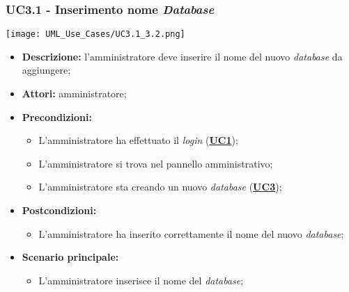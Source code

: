\subsubsection{UC3.1 - Inserimento nome \textit{Database}}
\label{sec:UC3.1}
\texttt{[image: UML\_Use\_Cases/UC3.1\_3.2.png]}
\begin{itemize}
	\item \textbf{Descrizione:} l’amministratore deve inserire il nome del nuovo \textit{database} da aggiungere;
	\item \textbf{Attori:} amministratore;
	\item \textbf{Precondizioni:} 
	\begin{itemize}
		\item L’amministratore ha effettuato il \textit{login} (\hyperref[sec:UC1]{\textbf{UC1}});
		\item L’amministratore si trova nel pannello amministrativo;
		\item L’amministratore sta creando un nuovo \textit{database} (\hyperref[sec:UC3]{\textbf{UC3}});
	\end{itemize}
	\item \textbf{Postcondizioni:} 
	\begin{itemize}
		\item L'amministratore ha inserito correttamente il nome del nuovo \textit{database};
	\end{itemize}
	\item \textbf{Scenario principale:} 
	\begin{itemize}
		\item L’amministratore inserisce il nome del \textit{database};
	\end{itemize}
\end{itemize}

